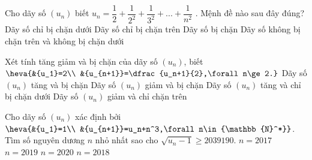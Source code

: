 \begin{ex}%
	Cho dãy  số $(u_n)$ biết $u_n=\dfrac{1}{2}+\dfrac{1}{2^2}+\dfrac{1}{3^2}+...+\dfrac{1}{n^2}$ . Mệnh đề nào sau đây đúng?
	\choice 
		{Dãy số chỉ bị chặn  dưới}
		{Dãy số  chỉ bị chặn trên}
		{\True Dãy số bị chặn} 
		{Dãy số không bị chặn trên và không  bị chặn dưới}
\end{ex}

\begin{ex}%
	Xét tính tăng giảm và  bị chặn của dãy số $(u_n)$, biết $\heva{&{u_1}=2\\
	&{u_{n+1}}=\dfrac{u_n+1}{2},\forall  n\ge 2.}$
	\choice 
		{Dãy số $(u_n)$ tăng và bị chặn} 
		{\True Dãy số  $(u_n)$ giảm và bị chặn}
		{Dãy  số $(u_n)$ tăng và chỉ bị chặn dưới}
		{Dãy số $(u_n)$ giảm và chỉ chặn trên} 
\end{ex}

\begin{ex}%
	Cho  dãy số $(u_n)$ xác định bởi $\heva{&{u_1}=1\\
	 &{u_{n+1}}=u_n+n^3,\forall n\in{\mathbb{N}^*}}$. Tìm số nguyên dương $n$ nhỏ nhất sao cho $\sqrt{u_n-1}\ge 2039190$.
	\choice 
		{$n=2017$} 
		 {$n=2019$}
		{\True $n=2020$} 
		{$n=2018$} 
\end{ex}

